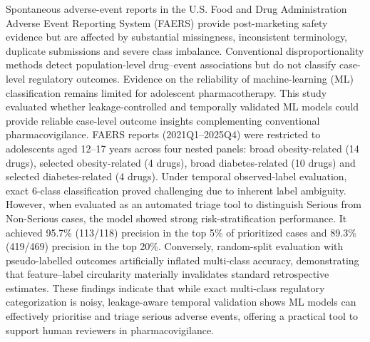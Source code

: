 \documentclass[10pt]{article}
\begin{document}
{   %
   \begin{tcolorbox}[enhanced,breakable,
     colback=white,colframe=black,boxrule=0.8pt,arc=2pt,
     left=8pt,right=8pt,top=6pt,bottom=6pt,
     title={\sffamily\bfseries\color{white} ABSTRACT},
     colbacktitle=black,coltitle=white,
     fonttitle=\normalsize]
   \small
   Spontaneous adverse-event reports in the U.S. Food and Drug Administration Adverse Event Reporting System (FAERS) provide post-marketing safety evidence but are affected by substantial missingness, inconsistent terminology, duplicate submissions and severe class imbalance. Conventional disproportionality methods detect population-level drug--event associations but do not classify case-level regulatory outcomes. Evidence on the reliability of machine-learning (ML) classification remains limited for adolescent pharmacotherapy. This study evaluated whether leakage-controlled and temporally validated ML models could provide reliable case-level outcome insights complementing conventional pharmacovigilance. FAERS reports (2021Q1--2025Q4) were restricted to adolescents aged 12--17 years across four nested panels: broad obesity-related (14 drugs), selected obesity-related (4 drugs), broad diabetes-related (10 drugs) and selected diabetes-related (4 drugs). Under temporal observed-label evaluation, exact 6-class classification proved challenging due to inherent label ambiguity. However, when evaluated as an automated triage tool to distinguish Serious from Non-Serious cases, the model showed strong risk-stratification performance. It achieved 95.7\% (113/118) precision in the top 5\% of prioritized cases and 89.3\% (419/469) precision in the top 20\%. Conversely, random-split evaluation with pseudo-labelled outcomes artificially inflated multi-class accuracy, demonstrating that feature--label circularity materially invalidates standard retrospective estimates. These findings indicate that while exact multi-class regulatory categorization is noisy, leakage-aware temporal validation shows ML models can effectively prioritise and triage serious adverse events, offering a practical tool to support human reviewers in pharmacovigilance.
   \end{tcolorbox}
   \vspace{12pt}
  }

\doublespacing        %
\end{document}
